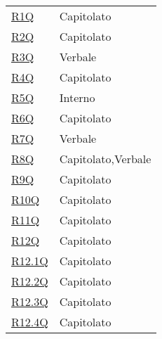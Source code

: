 \begin{center}
\begin{longtable}[!h]{p{50px} p{50px}}

        \hyperref[tab:RequisitiQualita]{R1Q}       & Capitolato                                     \\
        \hyperref[tab:RequisitiQualita]{R2Q}       & Capitolato                                     \\
        \hyperref[tab:RequisitiQualita]{R3Q}       & Verbale                                        \\
        \hyperref[tab:RequisitiQualita]{R4Q}       & Capitolato                                     \\
        \hyperref[tab:RequisitiQualita]{R5Q}       & Interno                                        \\
        \hyperref[tab:RequisitiQualita]{R6Q}       & Capitolato                                     \\
        \hyperref[tab:RequisitiQualita]{R7Q}       & Verbale                                        \\
        \hyperref[tab:RequisitiQualita]{R8Q}       & Capitolato,\newline Verbale                    \\
        \hyperref[tab:RequisitiQualita]{R9Q}       & Capitolato                                     \\
        \hyperref[tab:RequisitiQualita]{R10Q}      & Capitolato                                     \\
        \hyperref[tab:RequisitiVincolo]{R11Q}      & Capitolato                                     \\
        \hyperref[tab:RequisitiVincolo]{R12Q}      & Capitolato                                     \\
        \hyperref[tab:RequisitiVincolo]{R12.1Q}    & Capitolato                                     \\
        \hyperref[tab:RequisitiVincolo]{R12.2Q}    & Capitolato                                     \\
        \hyperref[tab:RequisitiVincolo]{R12.3Q}    & Capitolato                                     \\
        \hyperref[tab:RequisitiVincolo]{R12.4Q}    & Capitolato                                     \\



\end{longtable}
\end{center}
